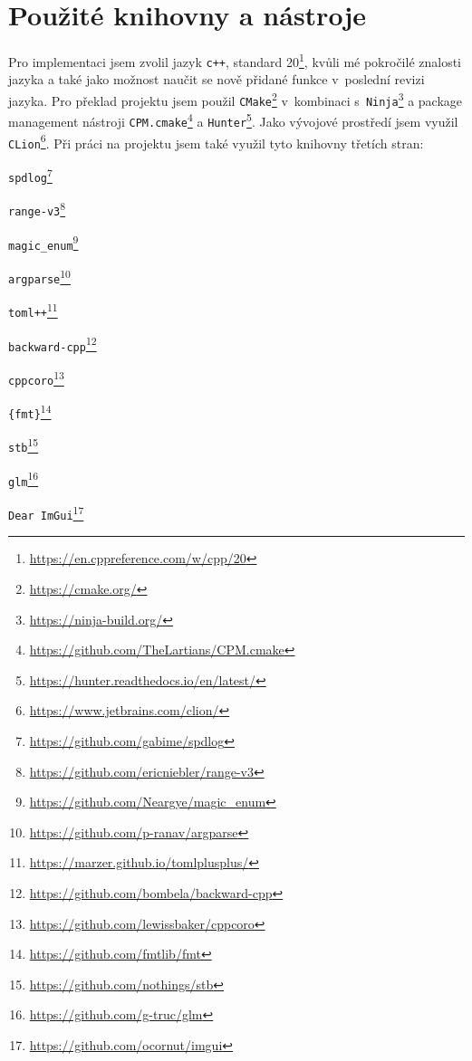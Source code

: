 \section{Použité knihovny a nástroje}
Pro implementaci jsem zvolil jazyk \texttt{c++}, standard 20\footnote{\url{https://en.cppreference.com/w/cpp/20}}, kvůli mé pokročilé znalosti jazyka a také jako možnost naučit se nově přidané funkce v~poslední revizi jazyka. Pro překlad projektu jsem použil \texttt{CMake}\footnote{\url{https://cmake.org/}} v~kombinaci s~\texttt{Ninja}\footnote{\url{https://ninja-build.org/}} a package management nástroji \texttt{CPM.cmake}\footnote{\url{https://github.com/TheLartians/CPM.cmake}} a \texttt{Hunter}\footnote{\url{https://hunter.readthedocs.io/en/latest/}}. Jako vývojové prostředí jsem využil \texttt{CLion}\footnote{\url{https://www.jetbrains.com/clion/}}. Při práci na projektu jsem také využil tyto knihovny třetích stran:

\begin{itemize}
\end{itemize}

